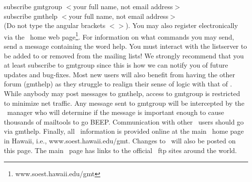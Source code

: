 \vspace{\baselineskip} 

subscribe gmtgroup $<$your full name, not email address$>$ \\

subscribe gmthelp $<$your full name, not email address$>$ \\

(Do not type the angular brackets $<$$>$).  You may also
register electronically via the \GMT\ home web
page\footnote{www.soest.hawaii.edu/gmt}.  For information
on what commands you may send, send a message containing
the word help.  You must interact with the listserver to be
added to or removed from the mailing lists!  We strongly recommend that you
at least subscribe to gmtgroup since this is how we can notify
you of future updates and bug-fixes.  Most new users will
also benefit from having the other forum (gmthelp) as they
struggle to realign their sense of logic with that of \GMT.
While anybody may post messages to gmthelp, access to gmtgroup
is restricted to minimize net traffic.  Any message sent to
gmtgroup will be intercepted by the \GMT\ manager who will
determine if the message is important enough to cause thousands
of mailtools to go BEEP.  Communication with other \GMT\ users
should go via gmthelp.  Finally, all \GMT\ information is provided
online at the main \GMT\ home page in Hawaii, i.e.,
www.soest.hawaii.edu/gmt.  Changes to \GMT\ will also be posted
on this page.  The main \GMT\ page has links to the official
\GMT\ ftp sites around the world.
